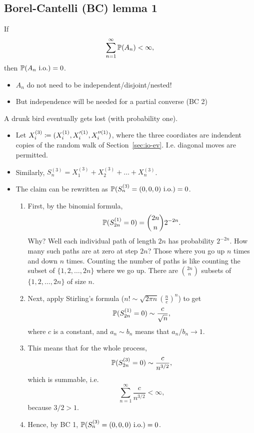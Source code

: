 \documentclass{article}
\begin{document}
\subsection{Borel-Cantelli (BC) lemma 1}

 If \[\sum_{n=1}^\infty \P(A_n) < \infty,\] then $\P(A_n\io) = 0$.

\begin{itemize}
  \item $A_n$ do not need to be independent/disjoint/nested!
  \item But independence will be needed for a partial converse (BC 2)
\end{itemize}

 A drunk bird eventually gets lost (with probability one).
\begin{itemize}
  \item Let $X_i^{(3)} \defeq (X^{(1)}_i, X'^{(1)}_i, X''^{(1)}_i)$, where the three coordiates are indendent copies of the random walk of Section~\ref{sec:io-ev}. I.e. diagonal moves are permitted.
  \item Similarly, $S_n^{(3)} = X_1^{(3)} + X_2^{(3)} + \dots + X_n^{(3)}$.
  \item The claim can be rewritten as $\P(S^{(3)}_n = (0,0,0)\io) = 0$.
  \begin{enumerate}
    \item First, by the binomial formula, \[\P(S^{(1)}_{2n} = 0) = \binom{2n}{n} 2^{-2n}.\]
    Why? Well each individual path of length $2n$ has probability $2^{-2n}$. How many such paths are at zero at step $2n$? Those where you go up $n$ times and down $n$ times. Counting the number of paths is like counting the subset of $\{1, 2, \dots, 2n\}$ where we go up. There are $\binom{2n}{n}$ subsets of $\{1, 2, \dots, 2n\}$ of size $n$.
    \item Next, apply Stirling's formula ($n! \sim \sqrt{2 \pi n}\left(\frac{n}{e}\right)^n$) to get \[\P(S^{(1)}_{2n} = 0)  \sim \frac{c}{\sqrt{n}},\] where $c$ is a constant, and $a_n \sim b_n$ means that $a_n/b_n \to 1$.
    \item This means that for the whole process,  \[\P(S^{(3)}_{2n} = 0)  \sim \frac{c}{n^{3/2}},\] which is summable, i.e. \[ \sum_{n=1}^\infty \frac{c}{n^{3/2}} < \infty,\] because $3/2 > 1$.
    \item Hence, by BC 1, $\P(S^{(3)}_n = (0,0,0)\io) = 0$.
  \end{enumerate}
\end{itemize}
\end{document}
